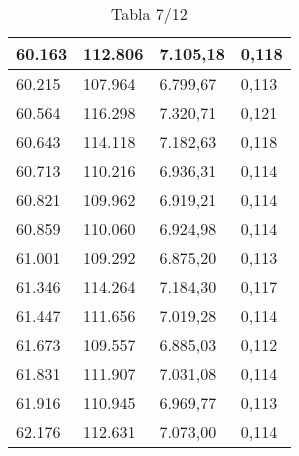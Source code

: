 \begin{table}[H]
{\begin{tabular}{| l | l | l |l |}
60.163	&	112.806	&	7.105,18	&	0,118	\\ \hline
60.215	&	107.964	&	6.799,67	&	0,113	\\ \hline
60.564	&	116.298	&	7.320,71	&	0,121	\\ \hline
60.643	&	114.118	&	7.182,63	&	0,118	\\ \hline
60.713	&	110.216	&	6.936,31	&	0,114	\\ \hline
60.821	&	109.962	&	6.919,21	&	0,114	\\ \hline
60.859	&	110.060	&	6.924,98	&	0,114	\\ \hline
61.001	&	109.292	&	6.875,20	&	0,113	\\ \hline
61.346	&	114.264	&	7.184,30	&	0,117	\\ \hline
61.447	&	111.656	&	7.019,28	&	0,114	\\ \hline
61.673	&	109.557	&	6.885,03	&	0,112	\\ \hline
61.831	&	111.907	&	7.031,08	&	0,114	\\ \hline
61.916	&	110.945	&	6.969,77	&	0,113	\\ \hline
62.176	&	112.631	&	7.073,00	&	0,114	\\ \hline
  \end{tabular}
  \caption*{Tabla 7/12}
}
\end{table}
